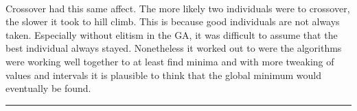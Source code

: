 \documentclass[paper=a4, fontsize=11pt]{scrartcl} %
\numberwithin{equation}{section} %
\numberwithin{figure}{section} %
\numberwithin{table}{section} %
\newcommand{\horrule}[1]{\rule{\linewidth}{#1}} %
\begin{document}
\paragraph{} Crossover had this same affect. The more likely two individuals were to crossover, the slower it took to hill climb. This is because good individuals are not always taken. Especially without elitism in the GA, it was difficult to assume that the best individual always stayed. Nonetheless it worked out to were the algorithms were working well together to at least find minima and with more tweaking of values and intervals it is plausible to think that the global minimum would eventually be found.

\horrule{0.5pt} \\[0.4cm] %
\end{document}
